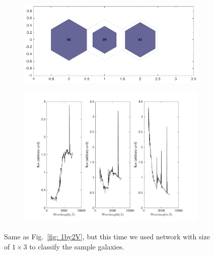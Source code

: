             \begin{figure}
                \begin{subfigure}[b]{0.5\textwidth}
                    \centering
                    \includegraphics[width=\textwidth]{../images/1d/hit_v_1_by_3.png}
                \end{subfigure}
                \hfill
                \begin{subfigure}[b]{0.55\textwidth}
                     \includegraphics[width=\textwidth]{../images/1d/SED_total1by3.png}
                \end{subfigure}
                \caption{Same as Fig.~\ref{fig: 1by2V}, but this time we used network with size of $1\times3$ to classify the sample galaxies.}
                \label{fig: 1by3V}
            \end{figure}       
            
